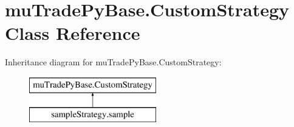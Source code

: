 \hypertarget{classmuTradePyBase_1_1CustomStrategy}{\section{mu\-Trade\-Py\-Base.\-Custom\-Strategy Class Reference}
\label{classmuTradePyBase_1_1CustomStrategy}
}
Inheritance diagram for mu\-Trade\-Py\-Base.\-Custom\-Strategy\-:\begin{figure}[H]
\begin{center}
\leavevmode
\includegraphics[height=2.000000cm]{classmuTradePyBase_1_1CustomStrategy}
\end{center}
\end{figure}
